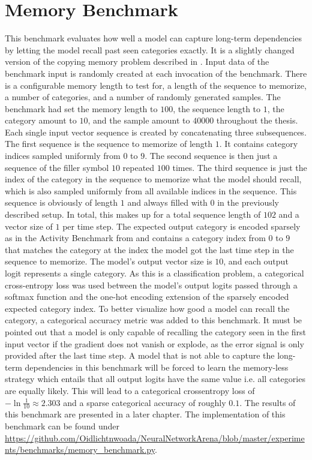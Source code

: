 \documentclass[draft,final]{vutinfth} %
\begin{document}
    \section{Memory Benchmark} \label{memory}
    This benchmark evaluates how well a model can capture long-term dependencies by letting the model recall past seen categories exactly.
    It is a slightly changed version of the copying memory problem described in \cite{UnitaryRNNs}.
    Input data of the benchmark input is randomly created at each invocation of the benchmark.
    There is a configurable memory length to test for, a length of the sequence to memorize, a number of categories, and a number of randomly generated samples.
    The benchmark had set the memory length to $100$, the sequence length to $1$, the category amount to $10$, and the sample amount to $40000$ throughout the thesis.
    Each single input vector sequence is created by concatenating three subsequences.
    The first sequence is the sequence to memorize of length $1$.
    It contains category indices sampled uniformly from $0$ to $9$.
    The second sequence is then just a sequence of the filler symbol $10$ repeated $100$ times.
    The third sequence is just the index of the category in the sequence to memorize what the model should recall, which is also sampled uniformly from all available indices in the sequence.
    This sequence is obviously of length $1$ and always filled with $0$ in the previously described setup.
    In total, this makes up for a total sequence length of $102$ and a vector size of $1$ per time step.
    The expected output category is encoded sparsely as in the Activity Benchmark from  and contains a category index from $0$ to $9$ that matches the category at the index the model got the last time step in the sequence to memorize.
    The model's output vector size is $10$, and each output logit represents a single category.
    As this is a classification problem, a categorical cross-entropy loss was used between the model's output logits passed through a softmax function and the one-hot encoding extension of the sparsely encoded expected category index.
    To better visualize how good a model can recall the category, a categorical accuracy metric was added to this benchmark.
    It must be pointed out that a model is only capable of recalling the category seen in the first input vector if the gradient does not vanish or explode, as the error signal is only provided after the last time step.
    A model that is not able to capture the long-term dependencies in this benchmark will be forced to learn the memory-less strategy which entails that all output logits have the same value i.e. all categories are equally likely.
    This will lead to a categorical crossentropy loss of $-\ln{\frac{1}{10}} \approx 2.303$ and a sparse categorical accuracy of roughly $0.1$.
    The results of this benchmark are presented in a later chapter.
    The implementation of this benchmark can be found under \url{https://github.com/Oidlichtnwoada/NeuralNetworkArena/blob/master/experiments/benchmarks/memory_benchmark.py}.
\end{document}
